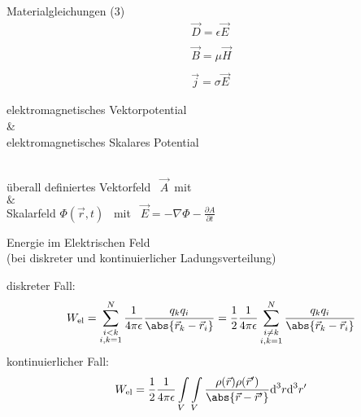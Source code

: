 \documentclass[a6paper]{kartei}
\newcommand{\dd}{\ensuremath{\text{d}}}
\begin{document}
	\begin{karte}{Materialgleichungen (3)}
		\begin{eqnarray*}
			\vec D =  \epsilon \vec E \\\\
			\vec B = \mu \vec H \\\\
			\vec j = \sigma \vec E
		\end{eqnarray*}
	\end{karte}


	\begin{karte}
		{elektromagnetisches Vektorpotential\\ \&\\elektromagnetisches Skalares Potential }
		\ \\ \ \\\begin{center}überall definiertes Vektorfeld  \ $\vec A $\ mit  \\ $\&$\\
			Skalarfeld $\Phi(\vec r, t)$ \ mit \
			$\vec E = - \nabla \Phi - \frac{\partial A}{\partial t}$
		\end{center}
	\end{karte}
	\begin{karte}{Energie im Elektrischen Feld\\ (bei diskreter und kontinuierlicher Ladungsverteilung)}

		diskreter Fall: \begin{eqnarray*}
			W_{\text{el}} = \sum \limits^N_{\substack{i < k \\ i,k = 1}} \frac{1}{4 \pi \epsilon} \frac{q_k q_i}{\abs{\vec r_k - \vec r_i}}=\frac{1}{2} \frac{1}{4 \pi \epsilon}\sum \limits^N_{\substack{i \not=  k \\ i,k = 1}}  \frac{q_k q_i}{\abs{\vec r_k - \vec r_i}}
		\end{eqnarray*}
		kontinuierlicher Fall: \begin{eqnarray*}
			W_{\text{el}} =\frac{1}{2} \frac{1}{4 \pi \epsilon}\int \limits_V\int \limits_V  \frac{\rho(\vec r) \rho(\vec r')}{\abs{\vec r - \vec r'}}\dd^3 r \dd^3 r'
		\end{eqnarray*}


	\end{karte}
\end{document}
